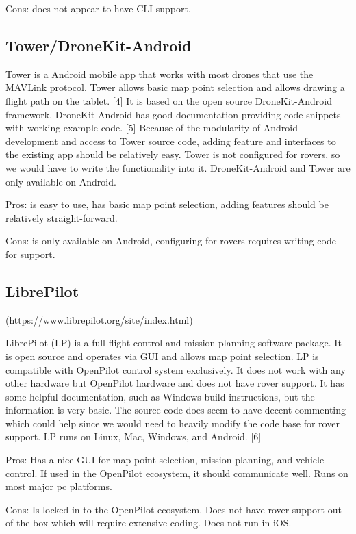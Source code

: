 \documentclass[compsoc,draftclsnofoot,onecolumn,10pt]{IEEEtran}
\begin{document}
Cons: does not appear to have CLI support.

\subsection{Tower/DroneKit-Android}
Tower is a Android mobile app that works with most drones that use the MAVLink
protocol. Tower allows basic map point selection and allows drawing a flight
path on the tablet. [4] It is based on the open source DroneKit-Android framework.
DroneKit-Android has good documentation providing code snippets with working
example code. [5] Because of the modularity of Android development and access to
Tower source code, adding feature and interfaces to the existing app should be
relatively easy. Tower is not configured for rovers, so we would have to write
the functionality into it. DroneKit-Android and Tower are only available on Android. 

Pros: is easy to use, has basic map point selection, adding features should be
relatively straight-forward.

Cons: is only available on Android, configuring for rovers requires writing code
for support.

\subsection{LibrePilot}
(https://www.librepilot.org/site/index.html)  

LibrePilot (LP) is a full flight control and mission planning software
package. It is open source and operates via GUI and allows map point selection.
LP is compatible with OpenPilot control system exclusively. It does not
work with any other hardware but OpenPilot hardware and does not have rover
support. It has some helpful documentation, such as Windows build instructions,
but the information is very basic. The source code does seem to have decent
commenting which could help since we would need to heavily modify the code base
for rover support. LP runs on Linux, Mac, Windows, and Android. [6]

Pros: Has a nice GUI for map point selection, mission planning, and vehicle
control. If used in the OpenPilot ecosystem, it should communicate well. Runs
on most major pc platforms.

Cons: Is locked in to the OpenPilot ecosystem. Does not have rover support out
of the box which will require extensive coding. Does not run in iOS.
\end{document}
